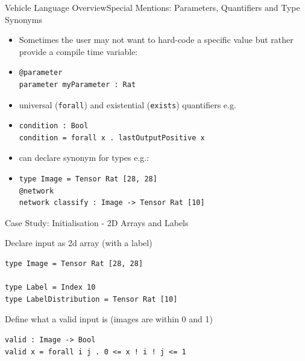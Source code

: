 \documentclass[t,compress,aspectratio=169]{beamer}
\newcommand{\vehicle}[1]{{\texttt{#1}}}
\begin{document}
\begin{frame}[containsverbatim]{Vehicle Language Overview}{Special Mentions: Parameters, Quantifiers and Type Synonyms}

\begin{itemize}
    \item Sometimes the user may not want to hard-code a specific value but rather provide a compile time variable:
    \item[]\begin{verbatim}
@parameter
parameter myParameter : Rat
\end{verbatim}
\end{itemize}

\begin{itemize}
    \item universal (\vehicle{forall}) and existential (\vehicle{exists}) quantifiers e.g.
\item[]\begin{verbatim}
condition : Bool
condition = forall x . lastOutputPositive x
\end{verbatim}
\end{itemize}

\begin{itemize}
    \item can declare synonym for types e.g.:
\item[]\begin{verbatim}
type Image = Tensor Rat [28, 28]
@network
network classify : Image -> Tensor Rat [10]
\end{verbatim}
\end{itemize}



\end{frame}


\begin{frame}[fragile]{Case Study: Initialisation - 2D Arrays and Labels}

Declare input as 2d array (with a label)

\begin{verbatim}
type Image = Tensor Rat [28, 28]

type Label = Index 10
type LabelDistribution = Tensor Rat [10]

\end{verbatim}


Define what a valid input is (images are within 0 and 1)


\begin{verbatim}
valid : Image -> Bool
valid x = forall i j . 0 <= x ! i ! j <= 1

\end{verbatim}

\end{frame}
\end{document}
